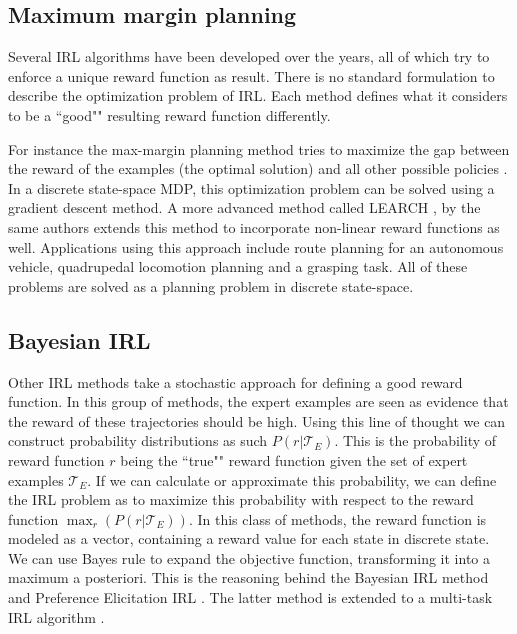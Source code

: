 \documentclass[mscThesis.tex]{subfiles}
\begin{document}
\subsection{Maximum margin planning}
Several IRL algorithms have been developed over the years, all of which try to enforce a unique reward function as result. There is no standard formulation to describe the optimization problem of IRL. Each method defines what it considers to be a ``good"" resulting reward function differently. 

For instance the max-margin planning method tries to maximize the gap between the reward of the examples (the optimal solution) and all other possible policies \cite{RatliffBagnell2006}. In a discrete state-space MDP, this optimization problem can be solved using a gradient descent method. A more advanced method called LEARCH \cite{Ratliff2009}, by the same authors extends this method to incorporate non-linear reward functions as well. Applications using this approach include route planning for an autonomous vehicle, quadrupedal locomotion planning and a grasping task. All of these problems are solved as a planning problem in discrete state-space. 


\subsection{Bayesian IRL}
Other IRL methods take a stochastic approach for defining a good reward function. In this group of methods, the expert examples are seen as evidence that the reward of these trajectories should be high. Using this line of thought we can construct probability distributions as such $P(r | \mathcal{T}_E)$. This is the probability of reward function $r$ being the ``true"" reward function given the set of expert examples $\mathcal{T}_E$. If we can calculate or approximate this probability, we can define the IRL problem as to maximize this probability with respect to the reward function $\max_r \left(P(r | \mathcal{T}_E) \right)$. In this class of methods, the reward function is modeled as a vector, containing a reward value for each state in discrete state. We can use Bayes rule to expand the objective function, transforming it into a maximum a posteriori. This is the reasoning behind the Bayesian IRL method \cite{RamachandranAmir2007} and Preference Elicitation IRL \cite{rothkopf2011preference}. The latter method is extended to a multi-task IRL algorithm \cite{dimitrakakis2011bayesian}.
\end{document}
